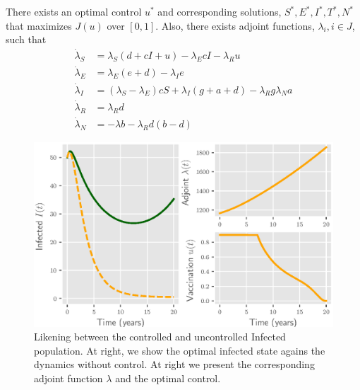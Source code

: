\begin{theorem} 
    There exists an optimal control $u^{*}$ and corresponding solutions, \break
    $S^{*}, E^{*}, I^{*}, T^{*}, N^{*}$ that maximizes $J(u)$ over $[0, 1]$. 
    Also, there exists adjoint functions, $\lambda_{i}, i \in J$, such that
    \begin{align*}
         \dot{\lambda}_{S} &=
            \lambda_{S}\left(d + cI + u \right) - \lambda_{E}cI - 
            \lambda_{R}u   \\
        \dot{\lambda}_{E} &=
            \lambda_{E}(e + d) - \lambda_{I}e  \\
        \dot{\lambda}_{I} &=
            (\lambda_{S} - \lambda_{E})cS + \lambda_{I}(g + a +d) - \lambda_{R}g
            \lambda_{N}a\\
        \dot{\lambda}_{R} &=    \lambda_{R}d  \\
        \dot{\lambda}_{N} &=
            - \lambda b - \lambda_{R}d  (b - d)
    \end{align*}
\end{theorem}

\begin{figure}[tbh!]
\centering
	\includegraphics{./Figures/epidemics_lenhart_lab7}
	\caption{Likening between the controlled and uncontrolled Infected 
	 population.  At right, we show the optimal infected state agains the 
	 dynamics without 
	 control. At right we present the corresponding adjoint function $\lambda$ 
	 and the optimal control.}
\label{fig:epidemicslenhartlab7}
\end{figure}
